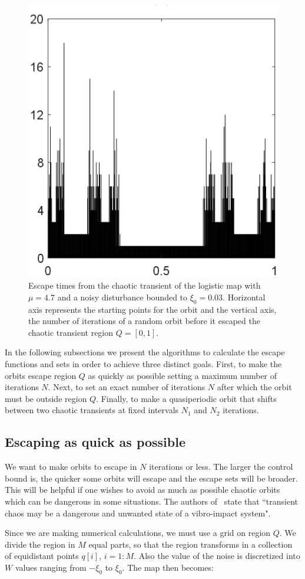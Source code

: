\begin{figure}
    \centering
    \includegraphics[width=0.5\linewidth]{Images/P1/EscapeTimes.eps}
    \caption{Escape times from the chaotic transient of the logistic map with $\mu=4.7$ and a noisy disturbance bounded to $\xi_0 = 0.03$. Horizontal axis represents the starting points for the orbit and the vertical axis, the number of iterations of a random orbit before it escaped the chaotic transient region $Q = [0,1]$.}
    \label{fig:EscapeTimes}
\end{figure}

In the following subsections we present the algorithms to calculate the escape functions and sets in order to achieve three distinct goals. First, to make the orbits escape region $Q$ as quickly as possible setting a maximum number of iterations $N$. Next, to set an exact number of iterations $N$ after which the orbit must be outside region $Q$. Finally, to make a quasiperiodic orbit that shifts between two chaotic transients at fixed intervals $N_1$ and $N_2$ iterations. 

\subsection{Escaping as quick as possible}

We want to make orbits to escape in $N$ iterations or less. The larger the control bound is, the quicker some orbits will escape and the escape sets will be broader. This will be helpful if one wishes to avoid as much as possible chaotic orbits which can be dangerous in some situations. The authors of~\cite{AvoidTransient1} state that ``transient chaos may be a dangerous and unwanted state of a vibro-impact system". 

Since we are making numerical calculations, we must use a grid on region $Q$. We divide the region in $M$ equal parts, so that the region transforms in a collection of equidistant points $q[i]$, $i=1:M$. Also the value of the noise is discretized into $W$ values ranging from $-\xi_0$ to $\xi_0$. The map then becomes:

